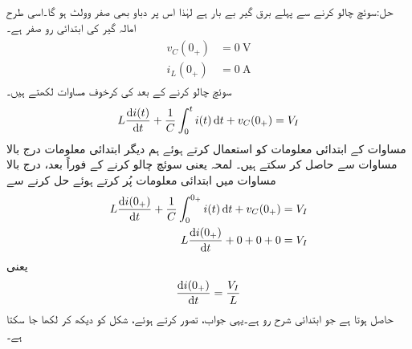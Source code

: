 حل:سوئچ چالو کرنے سے پہلے برق گیر بے بار ہے لہٰذا اس پر دباو بھی صفر وولٹ ہو گا۔اسی طرح امالہ گیر کی ابتدائی رو صفر ہے۔
\begin{gather}
\begin{aligned}\label{مساوات_عارضی_ابتدائی_معلومات_امالہ_برق_گیر_الف}
v_C(0_+)&=\SI{0}{\volt}\\
i_L(0_+)&=\SI{0}{\ampere}
\end{aligned}
\end{gather}
سوئچ چالو کرنے کے بعد کی کرخوف مساوات لکھتے ہیں۔
\begin{align}\label{مساوات_عارضی_امالہ_برق_گیر_الف}
L\frac{\dif i(t)}{\dif t}+\frac{1}{C}\int_{0}^{t} i(t)\dif t+v_C(0_+)=V_I
\end{align}
مساوات  کے ابتدائی معلومات کو استعمال کرتے ہوئے ہم دیگر ابتدائی معلومات درج بالا مساوات سے حاصل کر سکتے ہیں۔ لمحہ  یعنی سوئچ چالو کرنے کے فوراً بعد، درج بالا مساوات میں ابتدائی معلومات پُر کرتے ہوئے  حل کرنے سے
\begin{align*}
L\frac{\dif i(0_+)}{\dif t}+\frac{1}{C}\int_{0}^{0_+} i(t)\dif t+v_C(0_+)&=V_I\\
L\frac{\dif i(0_+)}{\dif t}+0+0+0&=V_I
\end{align*}
یعنی
\begin{align}
\frac{\dif i(0_+)}{\dif t}=\frac{V_I}{L}
\end{align}
حاصل ہوتا ہے جو ابتدائی شرح رو ہے۔یہی جواب،  تصور کرتے ہوئے، شکل  کو دیکھ کر لکھا جا سکتا ہے۔

